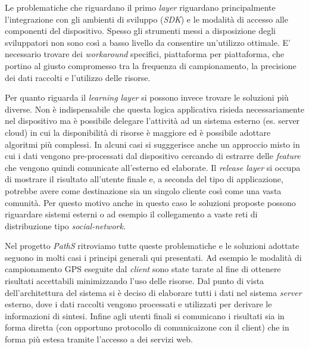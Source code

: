 Le problematiche che riguardano il primo \emph{layer} riguardano principalmente l'integrazione con gli ambienti di sviluppo (\emph{SDK}) e le modalità di accesso alle componenti del dispositivo. Spesso gli strumenti messi a disposizione degli sviluppatori non sono così a basso livello da consentire un'utilizzo ottimale. E' necessario trovare dei \emph{workaround} specifici, piattaforma per piattaforma, che portino al giusto compromesso tra la frequenza di campionamento, la precisione dei dati raccolti e l'utilizzo delle risorse.

Per quanto riguarda il \emph{learning layer} si possono invece trovare le soluzioni più diverse. Non è indispensabile che questa logica applicativa risieda necessariamente nel dispositivo ma è possibile delegare l'attività ad un sistema esterno (es. server cloud) in cui la disponibilità di risorse è maggiore ed è possibile adottare algoritmi più complessi. In alcuni casi si sugggerisce anche un approccio misto in cui i dati vengono pre-processati dal dispositivo cercando di estrarre delle \emph{feature} che vengono quindi comunicate all'esterno ed elaborate.
Il \emph{release layer} si occupa di mostrare il risultato all'utente finale e, a seconda del tipo di applicazione, potrebbe avere come destinazione sia un singolo cliente così come una vasta comunità. Per questo motivo anche in questo caso le soluzioni proposte possono riguardare sistemi esterni o ad esempio il collegamento a vaste reti di distribuzione tipo \emph{social-network}.

Nel progetto \emph{PathS} ritroviamo tutte queste problematiche e le soluzioni adottate seguono in molti casi i principi generali qui presentati. Ad esempio le modalità di campionamento GPS eseguite dal \emph{client} sono state tarate al fine di ottenere risultati accettabili minimizzando l'uso delle risorse. Dal punto di vista dell'architettura del sistema si è deciso di elaborare tutti i dati nel sistema \emph{server} esterno, dove i dati raccolti vengono processati e utilizzati per derivare le informazioni di sintesi. Infine agli utenti finali si comunicano i risultati sia in forma diretta (con opportuno protocollo di comunicaizone con il client) che in forma più estesa tramite l'accesso a dei servizi web.


